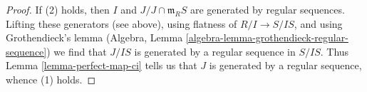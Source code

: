 \documentclass{stacks-project}
\theoremstyle{plain}
\theoremstyle{definition}
\theoremstyle{remark}
\numberwithin{equation}{subsection}
\begin{document}
\begin{proof}
\medskip\noindent
If (2) holds, then $I$ and $J/J \cap \mathfrak m_RS$
are generated by regular sequences. Lifting these generators
(see above), using flatness of $R/I \to S/IS$,
and using Grothendieck's lemma
(Algebra, Lemma \ref{algebra-lemma-grothendieck-regular-sequence})
we find that $J/IS$ is generated by a regular sequence in $S/IS$.
Thus Lemma \ref{lemma-perfect-map-ci} tells us that $J$
is generated by a regular sequence, whence (1) holds.
\end{proof}
\end{document}

